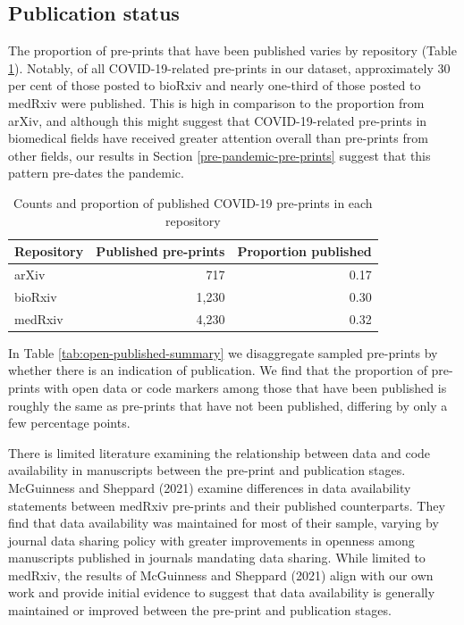 \documentclass[
]{article}
\begin{document}
\hypertarget{publication-status}{%
\subsection{Publication status}\label{publication-status}}

The proportion of pre-prints that have been published varies by repository (Table \ref{tab:published-sample-summary}). Notably, of all COVID-19-related pre-prints in our dataset, approximately 30 per cent of those posted to bioRxiv and nearly one-third of those posted to medRxiv were published. This is high in comparison to the proportion from arXiv, and although this might suggest that COVID-19-related pre-prints in biomedical fields have received greater attention overall than pre-prints from other fields, our results in Section \ref{pre-pandemic-pre-prints} suggest that this pattern pre-dates the pandemic.

\begin{table}

\caption{\label{tab:published-sample-summary}Counts and proportion of published COVID-19 pre-prints in each repository}
\centering
\begin{tabular}[t]{lrr}
\toprule
Repository & Published pre-prints & Proportion published\\
\midrule
arXiv & 717 & 0.17\\
bioRxiv & 1,230 & 0.30\\
medRxiv & 4,230 & 0.32\\
\bottomrule
\end{tabular}
\end{table}

In Table \ref{tab:open-published-summary} we disaggregate sampled pre-prints by whether there is an indication of publication. We find that the proportion of pre-prints with open data or code markers among those that have been published is roughly the same as pre-prints that have not been published, differing by only a few percentage points.

There is limited literature examining the relationship between data and code availability in manuscripts between the pre-print and publication stages. McGuinness and Sheppard (2021) examine differences in data availability statements between medRxiv pre-prints and their published counterparts. They find that data availability was maintained for most of their sample, varying by journal data sharing policy with greater improvements in openness among manuscripts published in journals mandating data sharing. While limited to medRxiv, the results of McGuinness and Sheppard (2021) align with our own work and provide initial evidence to suggest that data availability is generally maintained or improved between the pre-print and publication stages.
\end{document}
